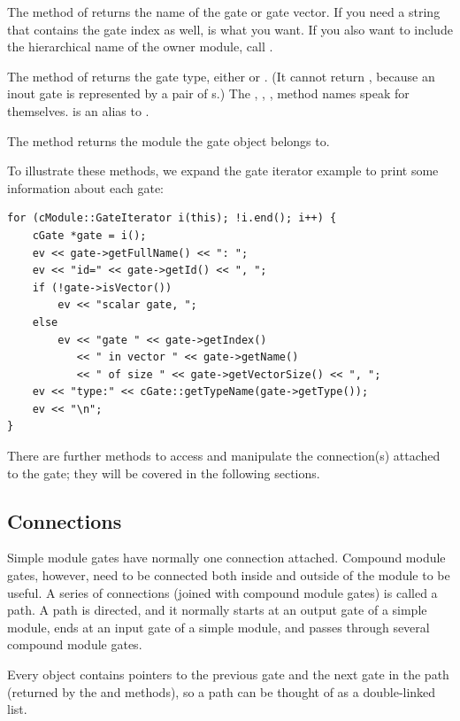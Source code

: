 The  method of  returns the name of the
gate or gate vector. If you need a string that contains the gate index
as well,  is what you want. If you also want to
include the hierarchical name of the owner module, call .

The  method of  returns the gate type,
either  or . (It cannot return
, because an inout gate is represented by a pair
of s.) The , ,
,  method names speak for themselves.
 is an alias to .

The  method returns the module the gate object
belongs to.

To illustrate these methods, we expand the gate iterator example
to print some information about each gate:

\begin{verbatim}
for (cModule::GateIterator i(this); !i.end(); i++) {
    cGate *gate = i();
    ev << gate->getFullName() << ": ";
    ev << "id=" << gate->getId() << ", ";
    if (!gate->isVector())
        ev << "scalar gate, ";
    else
        ev << "gate " << gate->getIndex()
           << " in vector " << gate->getName()
           << " of size " << gate->getVectorSize() << ", ";
    ev << "type:" << cGate::getTypeName(gate->getType());
    ev << "\n";
}
\end{verbatim}

There are further  methods to access and manipulate
the connection(s) attached to the gate; they will be covered in the
following sections.


\subsection{Connections}
\label{sec:simple-modules:connections}

Simple module gates have normally one connection attached. Compound module
gates, however, need to be connected both inside and outside of the
module to be useful. A series of connections (joined with compound
module gates) is called a path. A path is directed, and it normally
starts at an output gate of a simple module, ends at an input gate
of a simple module, and passes through several compound module gates.

Every  object contains pointers to the previous gate
and the next gate in the path (returned by the 
and  methods), so a path can be thought of as
a double-linked list.

